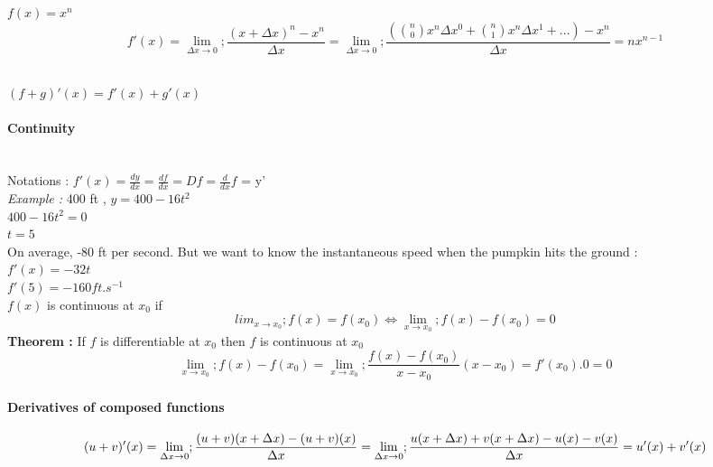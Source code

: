 \documentclass{article}
\begin{document}
                    $f(x) = x^n$\\
                    \[f'(x) = \lim_{\Delta x \to 0}; \frac{(x + \Delta x)^n - x^n}{\Delta x} = \lim_{\Delta x \to 0}; \frac{(\binom n0 x^n \Delta x ^0 + \binom n1 x^n \Delta x ^1 +... ) - x^n}{\Delta x} = nx^{n-1} \]

                    ~\\
                    $(f+g)'(x) = f'(x)+g'(x)$


                    \paragraph{Continuity}
                        ~\\
                        Notations : $f'(x) = \frac{dy}{dx} = \frac{df}{dx} = Df = \frac{d}{dx}f$ = y'\\

                        \noindent \textit{Example : } 400 ft , $y = 400 - 16t^2$\\
                        $400 -16t^2 = 0$\\
                        $t = 5$\\
                        On average, -80 ft per second. But we want to know the instantaneous speed when the pumpkin hits the ground :\\
                        $f'(x) = -32t$\\
                        $f'(5) = -160 ft.s^{-1}$\\

                        $f(x)$ is continuous at $x_0$ if
                        \[ lim_{x \to x_0}; f(x) = f(x_0)  \Leftrightarrow \lim_{x \to x_0}; f(x) - f(x_0) = 0\]
                        \textbf{Theorem :}
                            If $f$ is differentiable at $x_0$ then $f$ is continuous at $x_0$
                            \[\lim_{x \to x_0}; f(x) - f(x_0) = \lim_{x \to x_0};\frac{f(x) - f(x_0)}{x-x_0}(x-x_0) = f'(x_0).0 = 0 \]

                    \paragraph{Derivatives of composed functions}

                        \[ (u+v)'(x)= \lim_{\Delta x \to 0}; \frac{(u+v)(x+\Delta x) - (u +v)(x)}{\Delta x}\\
                        = \lim_{\Delta x \to 0}; \frac{u(x+\Delta x) + v(x+\Delta x) - u(x) - v(x)}{\Delta x}\\
                        = u'(x) + v'(x)
                        \]
\end{document}
